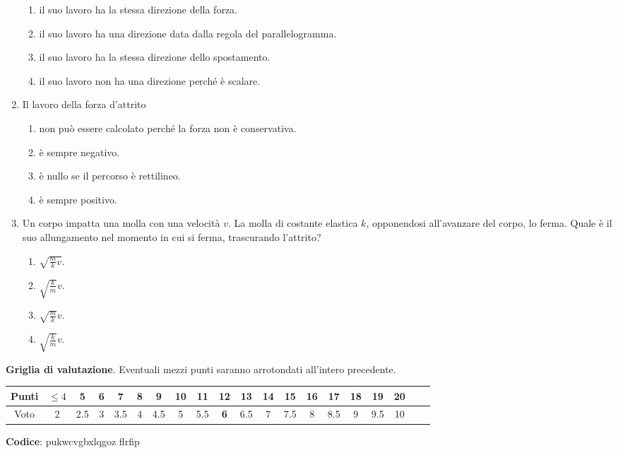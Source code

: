 \documentclass{article}
\begin{document}
\begin{enumerate}
\begin{enumerate}[label=\Alph*.]
    \item il suo lavoro ha la stessa direzione della forza.
    \item il suo lavoro ha una direzione data dalla regola del parallelogramma.
    \item il suo lavoro ha la stessa direzione dello spostamento.
    \item il suo lavoro non ha una direzione perché è scalare.
  \end{enumerate}
  \item Il lavoro della forza d'attrito
  \begin{enumerate}[label=\Alph*.]
    \item non può essere calcolato perché la forza non è conservativa.
    \item è sempre negativo.
    \item è nullo se il percorso è rettilineo.
    \item è sempre positivo.
  \end{enumerate}
  \item Un corpo impatta una molla con una velocità $v$. La molla di costante elastica $k$, opponendosi all'avanzare del corpo, lo ferma. Quale è il suo allungamento nel momento in cui si ferma, trascurando l'attrito?
  \begin{enumerate}[label=\Alph*.]
    \item $\sqrt{\frac{m}{k}v}$.
    \item $\sqrt{\frac{k}{m}}v$.
    \item $\sqrt{\frac{m}{k}}v$.
    \item $\sqrt{\frac{k}{m}}v$.
  \end{enumerate}
\end{enumerate}








\newpage \maketitle \centering \textbf{Griglia di valutazione}. Eventuali mezzi punti saranno arrotondati all'intero precedente. \begin{table}[h]     \centering \begin{tabular}{|c|c|c|c|c|c|c|c|c|c|c|c|c|c|c|c|c|c|c|c|} \hline Punti &  $\leq 4$ & 5 & 6 & 7 & 8 & 9 & 10 & 11 & \textbf{12} & 13 & 14 & 15 & 16 & 17 & 18 & 19 & 20 \\ \hline Voto & 2 & 2.5 & 3 & 3.5 & 4 & 4.5 & 5 & 5.5 & \textbf{6} & 6.5 & 7 & 7.5 & 8 & 8.5 & 9 & 9.5 & 10 \\ \hline \end{tabular} \end{table}
\textbf{Codice}: pukwcvgbxlqgoz flrfip
\end{document}
